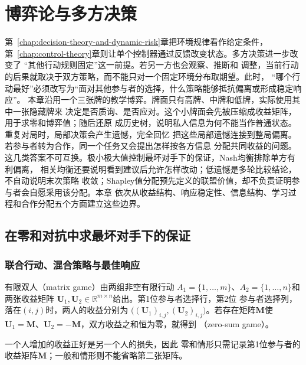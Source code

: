 \chapter{博弈论与多方决策}
\label{chap:game-theory-and-multi-agent-decision}

第~\ref{chap:decision-theory-and-dynamic-risk}章把环境规律看作给定条件，
第~\ref{chap:control-theory}章则让单个控制器通过反馈改变状态。多方决策进一步改变了
“其他行动规则固定”这一前提。若另一方也会观察、推断和
调整，当前行动的后果就取决于双方策略，而不能只对一个固定环境分布取期望。此时，
“哪个行动最好”必须改写为“面对其他参与者的选择，什么策略能够抵抗偏离或形成稳定响应”。
本章沿用一个三张牌的教学博弈。牌面只有高牌、中牌和低牌，实际使用其中一张隐藏牌来
决定是否质询、是否应对。这个小牌面会先被压缩成收益矩阵，用于求零和博弈值；随后还原
成历史树，说明私人信息为何不能当作普通状态。重复对局时，局部决策会产生遗憾，完全回忆
把这些局部遗憾连接到整局偏离。若参与者转为合作，同一个任务又会提出怎样按各方信息
分配共同收益的问题。
这几类答案不可互换。极小极大值控制最坏对手下的保证，Nash均衡排除单方有利偏离，
相关均衡还要说明看到建议后允许怎样改动；低遗憾是多轮比较结论，不自动说明末次策略
收敛；Shapley值分配预先定义的联盟价值，却不负责证明参与者会自愿采用该分配。本章
依次从收益结构、响应稳定性、信息结构、学习过程和合作分配五个方面建立这些边界。

\section{在零和对抗中求最坏对手下的保证}
\label{sec:game-matrix-zero-sum-duality}
\subsection{联合行动、混合策略与最佳响应}

\begin{definition}[有限矩阵博弈]
\label{def:game-finite-matrix-game}
有限双人（matrix game）由两组非空有限行动
\(A_1=\{1,\ldots,m\}\)、\(A_2=\{1,\ldots,n\}\)和两张收益矩阵
\(\bm{U}_1,\bm{U}_2\in\mathbb{R}^{m\times n}\)给出。第1位参与者选择行，第2位
参与者选择列，落在\((i,j)\)时，两人的收益分别为
\(\bigl((\bm{U}_1)_{i,j},(\bm{U}_2)_{i,j}\bigr)\)。若存在矩阵\(\bm{M}\)使
\(\bm{U}_1=\bm{M}\)、\(\bm{U}_2=-\bm{M}\)，双方收益之和恒为零，就得到
（zero-sum game）。
\end{definition}
一个人增加的收益正好是另一个人的损失，因此
零和情形只需记录第1位参与者的收益矩阵\(\bm{M}\)；一般和情形则不能省略第二张矩阵。

